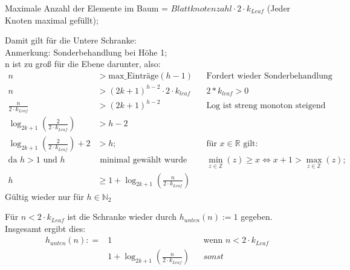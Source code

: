 \begin{note}
Maximale Anzahl der Elemente im Baum = $Blattknotenzahl \cdot 2\cdot k_{Leaf}$ (Jeder Knoten maximal gefüllt);

Damit gilt für die Untere Schranke:\\
Anmerkung: Sonderbehandlung bei Höhe 1;\\
n ist zu groß für die Ebene darunter, also:
\begin{align*}
n&> \textrm{max\_Einträge}(h-1)&& \textrm{Fordert wieder Sonderbehandlung von Höhe h=1}\\
n&> (2k+1)^{h-2}\cdot 2\cdot k_{leaf}&& 2*k_{leaf} >0\\
\frac{n}{2\cdot  k_{Leaf}} &> (2k+1)^{h-2} && \textrm{Log ist streng monoton steigend}\\
\log_{2k+1} (\frac{2}{2\cdot k_{Leaf}}) &> h-2\\
\log_{2k+1} (\frac{2}{2\cdot k_{Leaf}}) +2 &>h; && \textrm{für $x\in{\mathbb{R}}$ gilt:} \\
\textrm{da } h>1 \textrm{ und }h&\textrm{ minimal gewählt wurde}  && \min_{z\in\mathbb{Z}} (z) \geq x\Leftrightarrow x+1 >\max_{z\in\mathbb{Z}}(z);\\
h&\geq 1+\log_{2k+1}(\frac{n}{2\cdot k_{Leaf}})
\end{align*}
Gültig wieder nur für $h\in\mathbb{N}_2$

Für $n<2\cdot k_{Leaf}$ ist die Schranke wieder durch $h_{unten}(n):=1$ gegeben.\\
Insgesamt ergibt dies:\\
\begin{align*}
h_{unten}(n): = & 1 &&\textrm{wenn }n<2\cdot k_{Leaf}\\
& 1+\log_{2k+1}(\frac{n}{2\cdot k_{Leaf}}) && sonst
\end{align*}
\end{note}
